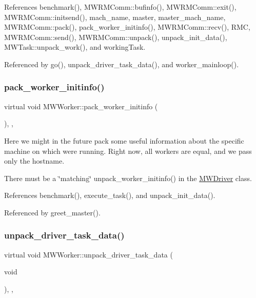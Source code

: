 References benchmark(), M\+W\+R\+M\+Comm\+::bufinfo(), M\+W\+R\+M\+Comm\+::exit(), M\+W\+R\+M\+Comm\+::initsend(), mach\+\_\+name, master, master\+\_\+mach\+\_\+name, M\+W\+R\+M\+Comm\+::pack(), pack\+\_\+worker\+\_\+initinfo(), M\+W\+R\+M\+Comm\+::recv(), R\+MC, M\+W\+R\+M\+Comm\+::send(), M\+W\+R\+M\+Comm\+::unpack(), unpack\+\_\+init\+\_\+data(), M\+W\+Task\+::unpack\+\_\+work(), and working\+Task.



Referenced by go(), unpack\+\_\+driver\+\_\+task\+\_\+data(), and worker\+\_\+mainloop().

\mbox{\label{classMWWorker_a8a71e471b6376a829ea9ec716f723ae8}} 
\subsubsection{\texorpdfstring{pack\+\_\+worker\+\_\+initinfo()}{pack\_worker\_initinfo()}}
{\footnotesize\ttfamily virtual void M\+W\+Worker\+::pack\+\_\+worker\+\_\+initinfo (\begin{DoxyParamCaption}{ }\end{DoxyParamCaption})\hspace{0.3cm}{\ttfamily [inline]}, {\ttfamily [protected]}, {\ttfamily [virtual]}}

Here we might in the future pack some useful information about the specific machine on which we\textquotesingle{}re running. Right now, all workers are equal, and we pass only the hostname.

There must be a \char`\"{}matching\char`\"{} unpack\+\_\+worker\+\_\+initinfo() in the \hyperlink{classMWDriver}{M\+W\+Driver} class. 

References benchmark(), execute\+\_\+task(), and unpack\+\_\+init\+\_\+data().



Referenced by greet\+\_\+master().

\mbox{\label{classMWWorker_a2c5ef75df666407d7268f51a86143eb6}} 
\subsubsection{\texorpdfstring{unpack\+\_\+driver\+\_\+task\+\_\+data()}{unpack\_driver\_task\_data()}}
{\footnotesize\ttfamily virtual void M\+W\+Worker\+::unpack\+\_\+driver\+\_\+task\+\_\+data (\begin{DoxyParamCaption}\item[{void}]{ }\end{DoxyParamCaption})\hspace{0.3cm}{\ttfamily [inline]}, {\ttfamily [protected]}, {\ttfamily [virtual]}}

